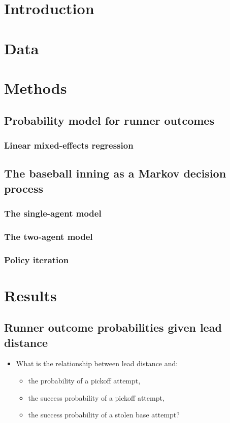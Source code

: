 \documentclass{article}
\begin{document}
    \section{Introduction}
    \section{Data}
    \section{Methods}
        \subsection{Probability model for runner outcomes}
            \subsubsection{Linear mixed-effects regression}
        \subsection{The baseball inning as a Markov decision process}
            \subsubsection{The single-agent model}
            \subsubsection{The two-agent model}
            \subsubsection{Policy iteration}
    \section{Results}
        \subsection{Runner outcome probabilities given lead distance}
            \begin{itemize}
                \item What is the relationship between lead distance and:
                \begin{itemize}
                    \item the probability of a pickoff attempt,
                    \item the success probability of a pickoff attempt,
                    \item the success probability of a stolen base attempt?
                \end{itemize}
            \end{itemize}
\end{document}
